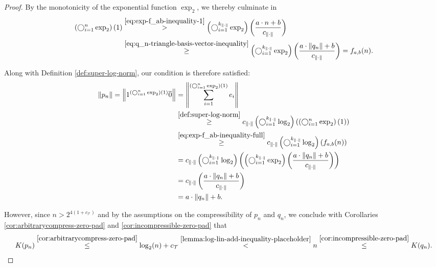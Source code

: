 \begin{proof}
	By the monotonicity of the exponential function $\exp_2$, we thereby culminate in
	\begin{align}
		\label{eq:exp-f_ab-inequality-full}
		\left(\bigcirc_{i=1}^n \exp_2\right)(1) &\overset{\ref{eq:exp-f_ab-inequality-1}}{>} \left(\bigcirc_{i=1}^{k_{\lVert\cdot\rVert}} \exp_2\right)\left( \frac{a\cdot n + b }{c_{\lVert\cdot\rVert}}\right) \\
		&\overset{\ref{eq:q_n-triangle-basis-vector-inequality}}{\geq} \left(\bigcirc_{i=1}^{k_{\lVert\cdot\rVert}} \exp_2\right)\left( \frac{a\cdot  \lVert q_n \rVert + b }{c_{\lVert\cdot\rVert}}\right)=f_{a,b}(n).
	\end{align}
	
	Along with Definition \ref{def:super-log-norm}, our condition is therefore satisfied:
	\begin{align}
		\lVert p_n\rVert = \left\lVert 1^{\left(\bigcirc_{i=1}^n \exp_2\right)(1)}\overline{0}\right\rVert 
		& =  \left\lVert \sum_{i=1}^{\left(\bigcirc_{i=1}^n \exp_2\right)(1)}e_i \right\rVert \\
		&\overset{\ref{def:super-log-norm}}{\geq} c_{\lVert\cdot\rVert}\left(\bigcirc_{i=1}^{k_{\lVert\cdot\rVert}}\log_2\right) \left( \left( \bigcirc_{i=1}^n \exp_2 \right)(1)\right) \\ 
		&\overset{\ref{eq:exp-f_ab-inequality-full}}{\geq} c_{\lVert\cdot\rVert}\left(\bigcirc_{i=1}^{k_{\lVert\cdot\rVert}}\log_2\right) \left( f_{a,b}(n) \right) \\ 
		&= c_{\lVert\cdot\rVert}\left(\bigcirc_{i=1}^{k_{\lVert\cdot\rVert}}\log_2\right) \left( \left(\bigcirc_{i=1}^{k_{\lVert\cdot\rVert}} \exp_2\right) \left(\frac{a\cdot \lVert q_n \rVert+b}{c_{\lVert\cdot\rVert}}\right) \right) \\
		&= c_{\lVert\cdot\rVert} \left(\frac{a\cdot \lVert q_n \rVert+b}{c_{\lVert\cdot\rVert}}\right)\\
		&= a\cdot \lVert q_n \rVert+b.
	\end{align}
	
	However, since $n> 2^{4(1+c_{\mathcal{T}})}$ and by the assumptions on the compressibility of $p_n$ and $q_n$, we conclude with Corollaries \ref{cor:arbitrarycompress-zero-pad} and \ref{cor:incompressible-zero-pad} that
	\begin{align}
		K(p_n)\overset{\ref{cor:arbitrarycompress-zero-pad}}{\leq}\log_2(n)+c_{\mathcal{T}} \overset{\ref{lemma:log-lin-add-inequality-placeholder}}{<} n \overset{\ref{cor:incompressible-zero-pad}}{\leq} K(q_n).
	\end{align}
\end{proof}

